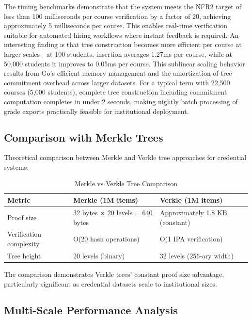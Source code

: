 The timing benchmarks demonstrate that the system meets the NFR2 target of less than 100 milliseconds per course verification by a factor of 20, achieving approximately 5 milliseconds per course. This enables real-time verification suitable for automated hiring workflows where instant feedback is required. An interesting finding is that tree construction becomes more efficient per course at larger scales—at 100 students, insertion averages 1.27ms per course, while at 50,000 students it improves to 0.05ms per course. This sublinear scaling behavior results from Go's efficient memory management and the amortization of tree commitment overhead across larger datasets. For a typical term with 22,500 courses (5,000 students), complete tree construction including commitment computation completes in under 2 seconds, making nightly batch processing of grade exports practically feasible for institutional deployment.

\subsection{Comparison with Merkle Trees}
\label{subsec:merkle-comparison}

Theoretical comparison between Merkle and Verkle tree approaches for credential systems:

\begin{table}[H]
\centering
\caption{Merkle vs Verkle Tree Comparison}
\label{tab:merkle-verkle-comparison}
\begin{tabular}{|p{4cm}|p{4cm}|p{4cm}|}
\hline
\textbf{Metric} & \textbf{Merkle (1M items)} & \textbf{Verkle (1M items)} \\
\hline
Proof size & 32 bytes × 20 levels = 640 bytes & Approximately 1.8 KB (constant) \\
\hline
Verification complexity & O(20 hash operations) & O(1 IPA verification) \\
\hline
Tree height & 20 levels (binary) & 32 levels (256-ary width) \\
\hline
\end{tabular}
\end{table}

The comparison demonstrates Verkle trees' constant proof size advantage, particularly significant as credential datasets scale to institutional sizes.

\subsection{Multi-Scale Performance Analysis}
\label{subsec:multi-scale}

